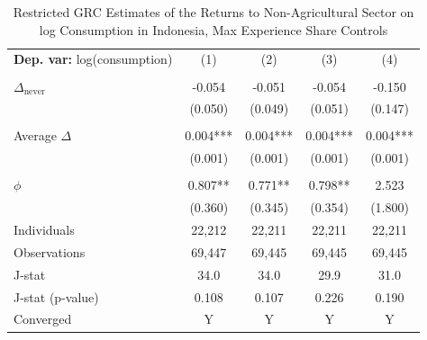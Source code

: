 \begin{table}[htbp] \centering \begin{threeparttable}
 \caption{Restricted GRC Estimates of the Returns to Non-Agricultural Sector on log Consumption in Indonesia, Max Experience Share Controls} 
 \label{tab:GRC_IDN_consumption_nonag_unb_exp_m_sh} 
\begin{tabular}{l cccc} \toprule  \textbf{Dep. var:}  log(consumption) 
                    &\multicolumn{1}{c}{(1)}   &\multicolumn{1}{c}{(2)}   &\multicolumn{1}{c}{(3)}   &\multicolumn{1}{c}{(4)}   \\
                    &               &               &               &               \\
\addlinespace
$\Delta_{\text{never}}$&      -0.054   &      -0.051   &      -0.054   &      -0.150   \\
                    &     (0.050)   &     (0.049)   &     (0.051)   &     (0.147)   \\
                    &               &               &               &               \\
\addlinespace
Average $\Delta$    &       0.004***&       0.004***&       0.004***&       0.004***\\
                    &     (0.001)   &     (0.001)   &     (0.001)   &     (0.001)   \\
                    &               &               &               &               \\
\addlinespace
$\phi$              &       0.807** &       0.771** &       0.798** &       2.523   \\
                    &     (0.360)   &     (0.345)   &     (0.354)   &     (1.800)   \\
\addlinespace
Individuals         &      22,212   &      22,211   &      22,211   &      22,211   \\
Observations        &      69,447   &      69,445   &      69,445   &      69,445   \\
J-stat              &        34.0   &        34.0   &        29.9   &        31.0   \\
J-stat (p-value)    &       0.108   &       0.107   &       0.226   &       0.190   \\
Converged           &           Y   &           Y   &           Y   &           Y   \\

\end{tabular}
\end{threeparttable}
\end{table}

